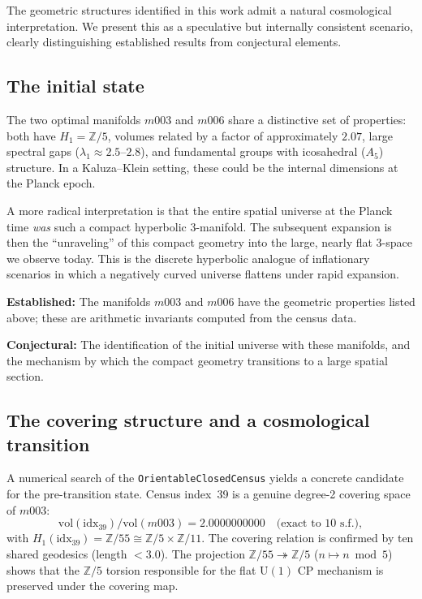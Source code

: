 ﻿\documentclass[12pt]{article}
\theoremstyle{definition}
\begin{document}
The geometric structures identified in this work admit a natural
cosmological interpretation. We present this as a speculative but
internally consistent scenario, clearly distinguishing established
results from conjectural elements.

\subsection{The initial state}

The two optimal manifolds $m003$ and $m006$ share a distinctive set
of properties: both have $H_1 = \mathbb{Z}/5$, volumes related by
a factor of approximately $2.07$, large spectral gaps
($\lambda_1 \approx 2.5$--$2.8$), and fundamental groups with
icosahedral ($A_5$) structure. In a Kaluza--Klein setting, these
could be the internal dimensions at the Planck epoch.

A more radical interpretation is that the entire spatial universe at
the Planck time \emph{was} such a compact hyperbolic 3-manifold. The
subsequent expansion is then the ``unraveling'' of this compact
geometry into the large, nearly flat 3-space we observe today. This
is the discrete hyperbolic analogue of inflationary scenarios in which
a negatively curved universe flattens under rapid expansion.

\textbf{Established:} The manifolds $m003$ and $m006$ have the
geometric properties listed above; these are arithmetic invariants
computed from the census data.

\textbf{Conjectural:} The identification of the initial universe with
these manifolds, and the mechanism by which the compact geometry
transitions to a large spatial section.

\subsection{The covering structure and a cosmological transition}
\label{sec:cover_cosm}

A numerical search of the \texttt{OrientableClosedCensus} yields
a concrete candidate for the pre-transition state. Census index~39
is a genuine degree-2 covering space of $m003$:
\[
  \mathrm{vol}(\text{idx}_{39}) / \mathrm{vol}(m003)
  = 2.0000000000 \quad \text{(exact to 10 s.f.)},
\]
with $H_1(\text{idx}_{39}) = \mathbb{Z}/55 \cong \mathbb{Z}/5
\times \mathbb{Z}/11$. The covering relation is confirmed by ten
shared geodesics (length $< 3.0$). The projection
$\mathbb{Z}/55 \twoheadrightarrow \mathbb{Z}/5$ ($n \mapsto n
\bmod 5$) shows that the $\mathbb{Z}/5$ torsion responsible for the
flat $\mathrm{U}(1)$ CP mechanism is preserved under the covering map.
\end{document}
